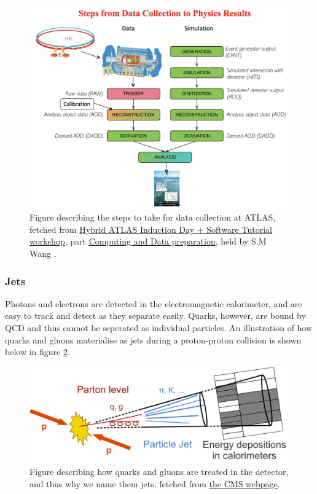 \begin{figure}[H]
    \includegraphics[width=\linewidth]{Figures/atlas/data_col_phys.png}
    \caption[Steps from data collection to physics results]{Figure describing the steps to take for data collection at ATLAS, fetched from \href{https://indico.cern.ch/event/1159574/timetable/?view=standard}{Hybrid ATLAS Induction Day + Software Tutorial workshop}, part
    \href{https://indico.cern.ch/event/860971/contributions/3672974/attachments/1972049/3280896/Atlas_computing_data_preparation_jan20.pdf}{Computing and Data preparation}, 
    held by S.M Wang \cite{Wang:2707056} . }
    \label{fig:atlas_data_col_phys}
\end{figure}


\subsubsection*{Jets}
Photons and electrons are detected in the electromagnetic calorimeter, and are easy to track and detect as they 
separate easily. Quarks, however, are bound by QCD and thus cannot be seperated as individual 
particles. An illustration of how quarks and gluons materialise as jets during a proton-proton 
collision is shown below in figure \ref{fig:cms_jets}.

\begin{figure}[H]
    \includegraphics[width=\linewidth]{Figures/atlas/cms_Sketch_PartonParticleCaloJet.png}
    \caption[Jet produciton from pp-collisions to detector]{Figure describing how quarks and gluons are treated in the detector, and thus why we name them jets, fetched from \href{https://cms.cern/sites/default/files/field/image/Sketch_PartonParticleCaloJet.png}{the CMS webpage}. }
    \label{fig:cms_jets}
\end{figure}


